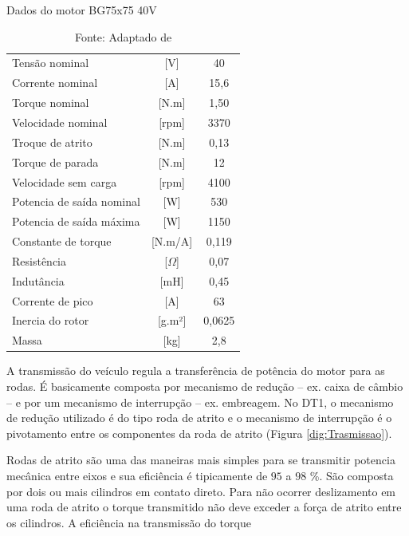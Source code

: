 \begin{table}[h]
	\centering
	\caption{Dados do motor BG75x75 40V}
	\label{tab:dadosBg75}
	\begin{tabular}{lcc}
		\toprule
		Tensão nominal            & {[}V{]}        & 40     \\
		Corrente nominal          & {[}A{]}        & 15,6   \\
		Torque nominal            & {[}N.m{]}      & 1,50    \\
		Velocidade nominal        & {[}rpm{]}      & 3370   \\
		Troque de atrito          & {[}N.m{]}      & 0,13   \\
		Torque de parada          & {[}N.m{]}      & 12     \\
		Velocidade sem carga      & {[}rpm{]}      & 4100   \\
		Potencia de saída nominal & {[}W{]}        & 530    \\
		Potencia de saída máxima  & {[}W{]}        & 1150   \\
		Constante de torque       & {[}N.m/A{]}    & 0,119  \\
		Resistência               & {[}$\Omega${]} & 0,07   \\
		Indutância                & {[}mH{]}       & 0,45   \\
		Corrente de pico          & {[}A{]}        & 63     \\
		Inercia do rotor          & {[}g.m²{]}     & 0,0625 \\
		Massa                     & {[}kg{]}       & 2,8    \\
		\bottomrule
	\end{tabular}
	\caption*{\footnotesize Fonte: Adaptado de }
\end{table}

A transmissão do veículo regula a transferência de potência do motor para as rodas. É basicamente composta por mecanismo de
redução -- ex. caixa de câmbio -- e por um mecanismo de interrupção -- ex. embreagem\cite{book:Modern_Electric_Vehicles}.
No DT1, o mecanismo de redução utilizado é do tipo roda de atrito e o mecanismo de interrupção é o pivotamento entre os componentes da roda de atrito (Figura \ref{dig:Trasmissao}).

Rodas de atrito são uma das maneiras mais simples para se transmitir potencia mecânica entre eixos e sua eficiência é tipicamente de $95$ a $98$ {\%}. São composta por dois ou mais cilindros em contato direto.  
Para não ocorrer deslizamento em uma roda de atrito o torque transmitido não deve exceder a força de atrito entre os cilindros. A eficiência na transmissão do torque 

